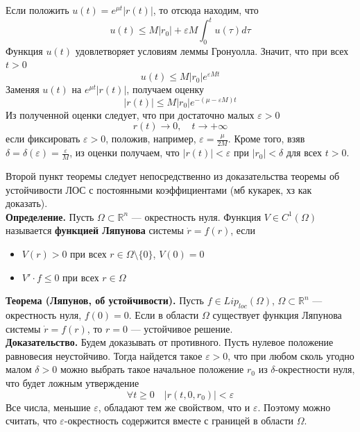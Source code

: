 \documentclass{article}
\begin{document}
Если положить $u(t) = e^{\mu t}|r(t)|$, то отсюда находим, что
\begin{equation*}
    u(t) \le M |r_0| + \varepsilon M\int_0^t u(\tau)d\tau
\end{equation*}
Функция $u(t)$ удовлетворяет условиям леммы Гронуолла. Значит, что при всех $t > 0$
\begin{equation*}
    u(t) \le M |r_0|e^{\varepsilon Mt}
\end{equation*}
Заменяя $u(t)$ на $e^{\mu t} |r(t)|$, получаем оценку
\begin{equation*}
    |r(t)| \le M |r_0|e^{-(\mu - \varepsilon M)t}
\end{equation*}
Из полученной оценки следует, что при достаточно малых $\varepsilon > 0$
\begin{equation*}
    r(t) \to 0, \quad t \to +\infty
\end{equation*}
если фиксировать $\varepsilon > 0$, положив, например, $\varepsilon = \frac{\mu}{2M}$. Кроме того, взяв $\delta = \delta(\varepsilon) = \frac{\varepsilon}{M}$, из оценки получаем, что $|r(t)| < \varepsilon$ при $|r_0| < \delta$ для всех $t > 0$.

Второй пункт теоремы следует непосредственно из доказательства теоремы об устойчивости ЛОС с постоянными коэффициентами (мб кукарек, хз как доказать).\\

\noindent \textbf{Определение.} Пусть $\Omega \subset \mathbb{R}^n$ --- окрестность нуля. Функция $V \in C^1(\Omega)$ называется \textbf{функцией Ляпунова} системы $\dot{r} = f(r)$, если
\begin{itemize}
    \item $V(r) > 0$ при всех $r \in \Omega \setminus \{0\}$, $V(0) = 0$
    \item $V' \cdot f \le 0$ при всех $r \in \Omega$
\end{itemize}

\noindent \textbf{Теорема (Ляпунов, об устойчивости).} Пусть $f \in Lip_{loc}(\Omega)$, $\Omega \subset \mathbb{R}^n$ --- окрестность нуля, $f(0) = 0$. Если в области $\Omega$ существует функция Ляпунова системы $\dot{r} = f(r)$, то $r = 0$ --- устойчивое решение.\\

\noindent \textbf{Доказательство.} Будем доказывать от противного. Пусть нулевое положение равновесия неустойчиво. Тогда найдется такое $\varepsilon > 0$, что при любом сколь угодно малом $\delta > 0$ можно выбрать такое начальное положение $r_0$ из $\delta$-окрестности нуля, что будет ложным утверждение
\begin{equation}
    \forall t \ge 0 \quad |r(t, 0, r_0)| < \varepsilon \label{lyap}
\end{equation}
Все числа, меньшие $\varepsilon$, обладают тем же свойством, что и $\varepsilon$. Поэтому можно считать, что $\varepsilon$-окрестность содержится вместе с границей в области $\Omega$.
\end{document}

